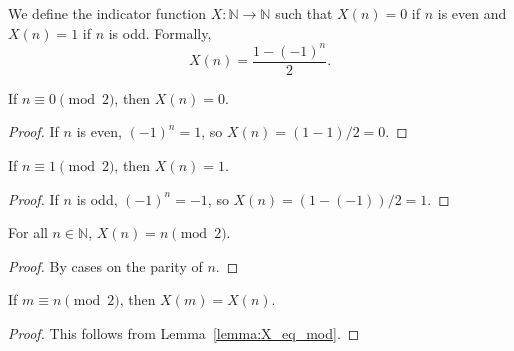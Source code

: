 \begin{definition}\label{def:X}\leanok
We define the indicator function $X: \mathbb{N} \to \mathbb{N}$ such that $X(n) = 0$ if $n$ is even and $X(n) = 1$ if $n$ is odd.
Formally,
\begin{equation}
    X(n) = \frac{1 - (-1)^n}{2}.
\end{equation}
\end{definition}

\begin{lemma}\label{lemma:X_even}\leanok
If $n \equiv 0 \pmod 2$, then $X(n) = 0$.
\end{lemma}
\begin{proof}\leanok
If $n$ is even, $(-1)^n = 1$, so $X(n) = (1 - 1)/2 = 0$.
\end{proof}

\begin{lemma}\label{lemma:X_odd}\leanok
If $n \equiv 1 \pmod 2$, then $X(n) = 1$.
\end{lemma}
\begin{proof}\leanok
If $n$ is odd, $(-1)^n = -1$, so $X(n) = (1 - (-1))/2 = 1$.
\end{proof}

\begin{lemma}\label{lemma:X_eq_mod}\leanok
For all $n \in \mathbb{N}$, $X(n) = n \pmod 2$.
\end{lemma}
\begin{proof}\leanok
By cases on the parity of $n$.
\end{proof}

\begin{lemma}\label{lemma:X_congr}\leanok
If $m \equiv n \pmod 2$, then $X(m) = X(n)$.
\end{lemma}
\begin{proof}\leanok
This follows from Lemma~\ref{lemma:X_eq_mod}.
\end{proof}
